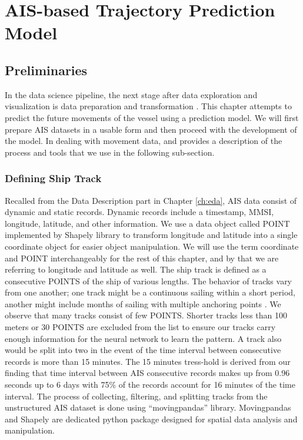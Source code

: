 
\chapter{AIS-based Trajectory Prediction Model}
\label{ch:univariate}
\vspace{2em}

\section{Preliminaries}
In the data science pipeline, the next stage after data exploration and visualization is data preparation and transformation \cite{geron2017handson}. This chapter attempts to predict the future movements of the vessel using a prediction model. We will first prepare AIS datasets in a usable form and then proceed with the development of the model. In dealing with movement data, \cite{liraz2018ships} and \cite{graser2020open} provides a description of the process and tools that we use in the following sub-section.

\subsection{Defining Ship Track}
Recalled from the Data Description part in Chapter \ref{ch:eda}, AIS data consist of dynamic and static records. Dynamic records include a timestamp, MMSI, longitude, latitude, and other information. We use a data object called POINT implemented by Shapely library to transform longitude and latitude into a single coordinate object for easier object manipulation. We will use the term coordinate and POINT interchangeably for the rest of this chapter, and by that we are referring to longitude and latitude as well. The ship track is defined as a consecutive POINTS of the ship of various lengths. The behavior of tracks vary from one another; one track might be a continuous sailing within a short period, another might include months of sailing with multiple anchoring points \cite{liraz2018ships}. We observe that many tracks consist of few POINTS. Shorter tracks less than 100 meters or 30 POINTS are excluded from the list to ensure our tracks carry enough information for the neural network to learn the pattern. A track also would be split into two in the event of the time interval between consecutive records is more than 15 minutes. The 15 minutes tress-hold is derived from our finding that time interval between AIS consecutive records makes up from 0.96 seconds up to 6 days with 75\% of the records account for 16 minutes of the time interval. The process of collecting, filtering, and splitting tracks from the unstructured AIS dataset is done using ``movingpandas'' library. Movingpandas \cite{graser2020open} and Shapely are dedicated python package designed for spatial data analysis and manipulation.

